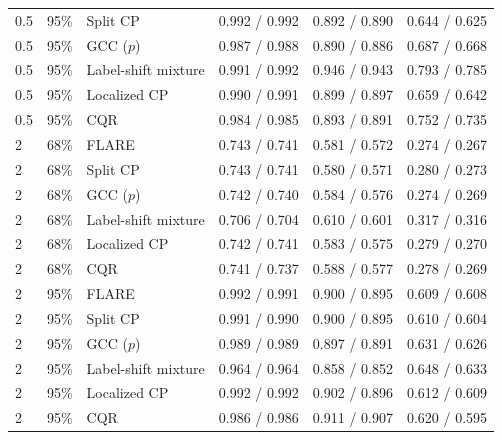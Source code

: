 \begin{table}[!htbp]
\begin{tabular}{lllccc}
0.5 & 95\% & Split CP & 0.992 / 0.992 & 0.892 / 0.890 & 0.644 / 0.625 \\
0.5 & 95\% & GCC ($p$) & 0.987 / 0.988 & 0.890 / 0.886 & 0.687 / 0.668 \\
0.5 & 95\% & Label-shift mixture & 0.991 / 0.992 & 0.946 / 0.943 & 0.793 / 0.785 \\
0.5 & 95\% & Localized CP & 0.990 / 0.991 & 0.899 / 0.897 & 0.659 / 0.642 \\
0.5 & 95\% & CQR & 0.984 / 0.985 & 0.893 / 0.891 & 0.752 / 0.735 \\
\midrule
2 & 68\% & FLARE & 0.743 / 0.741 & 0.581 / 0.572 & 0.274 / 0.267 \\
2 & 68\% & Split CP & 0.743 / 0.741 & 0.580 / 0.571 & 0.280 / 0.273 \\
2 & 68\% & GCC ($p$) & 0.742 / 0.740 & 0.584 / 0.576 & 0.274 / 0.269 \\
2 & 68\% & Label-shift mixture & 0.706 / 0.704 & 0.610 / 0.601 & 0.317 / 0.316 \\
2 & 68\% & Localized CP & 0.742 / 0.741 & 0.583 / 0.575 & 0.279 / 0.270 \\
2 & 68\% & CQR & 0.741 / 0.737 & 0.588 / 0.577 & 0.278 / 0.269 \\
\midrule
2 & 95\% & FLARE & 0.992 / 0.991 & 0.900 / 0.895 & 0.609 / 0.608 \\
2 & 95\% & Split CP & 0.991 / 0.990 & 0.900 / 0.895 & 0.610 / 0.604 \\
2 & 95\% & GCC ($p$) & 0.989 / 0.989 & 0.897 / 0.891 & 0.631 / 0.626 \\
2 & 95\% & Label-shift mixture & 0.964 / 0.964 & 0.858 / 0.852 & 0.648 / 0.633 \\
2 & 95\% & Localized CP & 0.992 / 0.992 & 0.902 / 0.896 & 0.612 / 0.609 \\
2 & 95\% & CQR & 0.986 / 0.986 & 0.911 / 0.907 & 0.620 / 0.595 \\
\bottomrule
\end{tabular}
\end{table}
